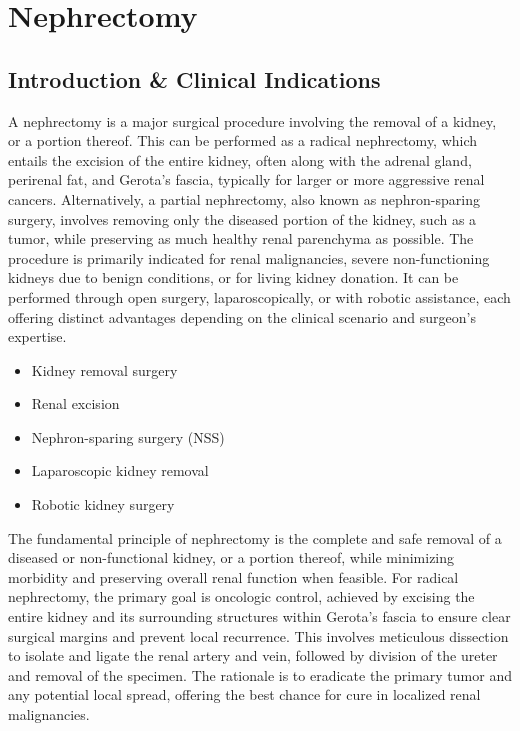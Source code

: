 \chapter{Nephrectomy}

\section*{Introduction \& Clinical Indications}
A nephrectomy is a major surgical procedure involving the removal of a kidney, or a portion thereof. This can be performed as a radical nephrectomy, which entails the excision of the entire kidney, often along with the adrenal gland, perirenal fat, and Gerota's fascia, typically for larger or more aggressive renal cancers. Alternatively, a partial nephrectomy, also known as nephron-sparing surgery, involves removing only the diseased portion of the kidney, such as a tumor, while preserving as much healthy renal parenchyma as possible. The procedure is primarily indicated for renal malignancies, severe non-functioning kidneys due to benign conditions, or for living kidney donation. It can be performed through open surgery, laparoscopically, or with robotic assistance, each offering distinct advantages depending on the clinical scenario and surgeon's expertise.

\begin{itemize}
  \item Kidney removal surgery
  \item Renal excision
  \item Nephron-sparing surgery (NSS)
  \item Laparoscopic kidney removal
  \item Robotic kidney surgery
\end{itemize}

The fundamental principle of nephrectomy is the complete and safe removal of a diseased or non-functional kidney, or a portion thereof, while minimizing morbidity and preserving overall renal function when feasible. For radical nephrectomy, the primary goal is oncologic control, achieved by excising the entire kidney and its surrounding structures within Gerota's fascia to ensure clear surgical margins and prevent local recurrence. This involves meticulous dissection to isolate and ligate the renal artery and vein, followed by division of the ureter and removal of the specimen. The rationale is to eradicate the primary tumor and any potential local spread, offering the best chance for cure in localized renal malignancies.

